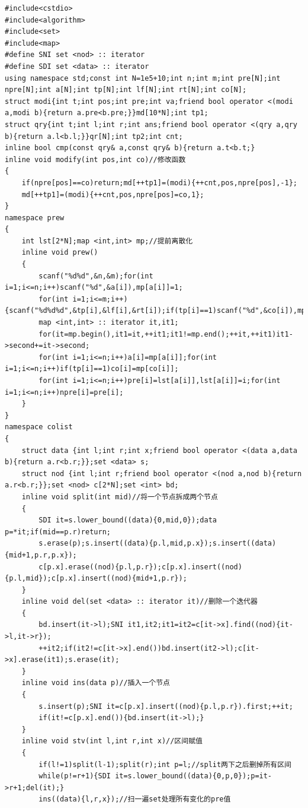 \begin{verbatim}
#include<cstdio>
#include<algorithm>
#include<set>
#include<map> 
#define SNI set <nod> :: iterator 
#define SDI set <data> :: iterator 
using namespace std;const int N=1e5+10;int n;int m;int pre[N];int npre[N];int a[N];int tp[N];int lf[N];int rt[N];int co[N];
struct modi{int t;int pos;int pre;int va;friend bool operator <(modi a,modi b){return a.pre<b.pre;}}md[10*N];int tp1;
struct qry{int t;int l;int r;int ans;friend bool operator <(qry a,qry b){return a.l<b.l;}}qr[N];int tp2;int cnt;
inline bool cmp(const qry& a,const qry& b){return a.t<b.t;}
inline void modify(int pos,int co)//修改函数
{
    if(npre[pos]==co)return;md[++tp1]=(modi){++cnt,pos,npre[pos],-1};
    md[++tp1]=(modi){++cnt,pos,npre[pos]=co,1};
}
namespace prew
{
    int lst[2*N];map <int,int> mp;//提前离散化
    inline void prew()
    {
        scanf("%d%d",&n,&m);for(int i=1;i<=n;i++)scanf("%d",&a[i]),mp[a[i]]=1;
        for(int i=1;i<=m;i++){scanf("%d%d%d",&tp[i],&lf[i],&rt[i]);if(tp[i]==1)scanf("%d",&co[i]),mp[co[i]]=1;}
        map <int,int> :: iterator it,it1;
        for(it=mp.begin(),it1=it,++it1;it1!=mp.end();++it,++it1)it1->second+=it->second;
        for(int i=1;i<=n;i++)a[i]=mp[a[i]];for(int i=1;i<=n;i++)if(tp[i]==1)co[i]=mp[co[i]];
        for(int i=1;i<=n;i++)pre[i]=lst[a[i]],lst[a[i]]=i;for(int i=1;i<=n;i++)npre[i]=pre[i];
    }
}
namespace colist
{
    struct data {int l;int r;int x;friend bool operator <(data a,data b){return a.r<b.r;}};set <data> s;
    struct nod {int l;int r;friend bool operator <(nod a,nod b){return a.r<b.r;}};set <nod> c[2*N];set <int> bd;
    inline void split(int mid)//将一个节点拆成两个节点
    {
        SDI it=s.lower_bound((data){0,mid,0});data p=*it;if(mid==p.r)return;
        s.erase(p);s.insert((data){p.l,mid,p.x});s.insert((data){mid+1,p.r,p.x});
        c[p.x].erase((nod){p.l,p.r});c[p.x].insert((nod){p.l,mid});c[p.x].insert((nod){mid+1,p.r});
    }
    inline void del(set <data> :: iterator it)//删除一个迭代器
    {
        bd.insert(it->l);SNI it1,it2;it1=it2=c[it->x].find((nod){it->l,it->r});
        ++it2;if(it2!=c[it->x].end())bd.insert(it2->l);c[it->x].erase(it1);s.erase(it);
    }
    inline void ins(data p)//插入一个节点
    {
        s.insert(p);SNI it=c[p.x].insert((nod){p.l,p.r}).first;++it;
        if(it!=c[p.x].end()){bd.insert(it->l);}
    }
    inline void stv(int l,int r,int x)//区间赋值
    {
        if(l!=1)split(l-1);split(r);int p=l;//split两下之后删掉所有区间
        while(p!=r+1){SDI it=s.lower_bound((data){0,p,0});p=it->r+1;del(it);}
        ins((data){l,r,x});//扫一遍set处理所有变化的pre值

\end{verbatim}

